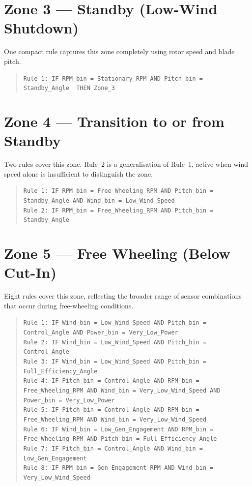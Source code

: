 {\section*{Zone 3 --- Standby (Low-Wind Shutdown)}
One compact rule captures this zone completely using rotor speed and blade pitch.
\begin{quote}
\texttt{Rule 1: IF RPM\_bin = Stationary\_RPM AND Pitch\_bin = Standby\_Angle\ \ THEN Zone\_3}
\end{quote}

\section*{Zone 4 --- Transition to or from Standby}
Two rules cover this zone. Rule~2 is a generalisation of Rule~1, active when wind speed
alone is insufficient to distinguish the zone.
\begin{quote}
\texttt{Rule 1: IF RPM\_bin = Free\_Wheeling\_RPM AND Pitch\_bin = Standby\_Angle AND Wind\_bin = Low\_Wind\_Speed}\\
\texttt{Rule 2: IF RPM\_bin = Free\_Wheeling\_RPM AND Pitch\_bin = Standby\_Angle}
\end{quote}

\section*{Zone 5 --- Free Wheeling (Below Cut-In)}
Eight rules cover this zone, reflecting the broader range of sensor combinations that
occur during free-wheeling conditions.
\begin{quote}
\texttt{Rule 1: IF Wind\_bin = Low\_Wind\_Speed AND Pitch\_bin = Control\_Angle AND Power\_bin = Very\_Low\_Power}\\
\texttt{Rule 2: IF Wind\_bin = Low\_Wind\_Speed AND Pitch\_bin = Control\_Angle}\\
\texttt{Rule 3: IF Wind\_bin = Low\_Wind\_Speed AND Pitch\_bin = Full\_Efficiency\_Angle}\\
\texttt{Rule 4: IF Pitch\_bin = Control\_Angle AND RPM\_bin = Free\_Wheeling\_RPM AND Wind\_bin = Very\_Low\_Wind\_Speed AND Power\_bin = Very\_Low\_Power}\\
\texttt{Rule 5: IF Pitch\_bin = Control\_Angle AND RPM\_bin = Free\_Wheeling\_RPM AND Wind\_bin = Very\_Low\_Wind\_Speed}\\
\texttt{Rule 6: IF Wind\_bin = Low\_Gen\_Engagement AND RPM\_bin = Free\_Wheeling\_RPM AND Pitch\_bin = Full\_Efficiency\_Angle}\\
\texttt{Rule 7: IF Pitch\_bin = Control\_Angle AND Wind\_bin = Low\_Gen\_Engagement}\\
\texttt{Rule 8: IF RPM\_bin = Gen\_Engagement\_RPM AND Wind\_bin = Very\_Low\_Wind\_Speed}
\end{quote}

}
